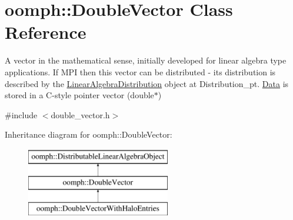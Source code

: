 \hypertarget{classoomph_1_1DoubleVector}{}\section{oomph\+:\+:Double\+Vector Class Reference}
\label{classoomph_1_1DoubleVector}


A vector in the mathematical sense, initially developed for linear algebra type applications. If M\+PI then this vector can be distributed -\/ its distribution is described by the \hyperlink{classoomph_1_1LinearAlgebraDistribution}{Linear\+Algebra\+Distribution} object at Distribution\+\_\+pt. \hyperlink{classoomph_1_1Data}{Data} is stored in a C-\/style pointer vector (double$\ast$)  




{\ttfamily \#include $<$double\+\_\+vector.\+h$>$}

Inheritance diagram for oomph\+:\+:Double\+Vector\+:\begin{figure}[H]
\begin{center}
\leavevmode
\includegraphics[height=3.000000cm]{classoomph_1_1DoubleVector}
\end{center}
\end{figure}
